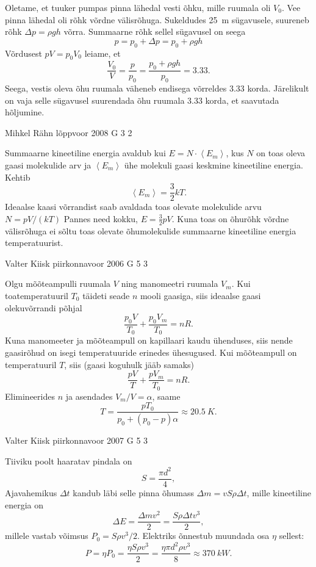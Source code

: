 \documentclass[11pt]{article}
\begin{document}
{{\ifSolution
Oletame, et tuuker pumpas pinna lähedal vesti õhku, mille ruumala oli $V_0$. Vee pinna lähedal oli rõhk võrdne välisrõhuga. Sukeldudes \SI{25}{m} sügavusele, suureneb rõhk $\Delta p = \rho gh$ võrra. Summaarne rõhk sellel sügavusel on seega
\[
p=p_{0}+\Delta p=p_{0}+\rho g h
\]
Võrdusest $pV=p_0V_0$ leiame, et
\[
\frac{V_{0}}{V}=\frac{p}{p_{0}}=\frac{p_{0}+\rho g h}{p_{0}}=\num{3,33}.
\]
Seega, vestis oleva õhu ruumala väheneb endisega võrreldes \num{3,33} korda. Järelikult on vaja selle sügavusel suurendada õhu ruumala \num{3,33} korda, et saavutada hõljumine.
\fi
}

{Mihkel Rähn} %
{lõppvoor} %
{2008} %
{G 3} %
{2} %
{

\ifSolution
Summaarne kineetiline energia avaldub kui $E = N \cdot \left\langle E_m\right\rangle$, kus $N$ on toas oleva gaasi molekulide arv ja $\left\langle E_m\right\rangle$ ühe molekuli gaasi keskmine kineetiline energia. Kehtib
\[
\left\langle E_{m}\right\rangle=\frac{3}{2} k T.
\]
Ideaalse kaasi võrrandist saab avaldada toas olevate molekulide arvu $N = pV /(kT)$ Pannes need kokku, $E = \frac{3}{2} pV$. Kuna toas on õhurõhk võrdne välisrõhuga ei sõltu toas olevate õhumolekulide summaarne kineetiline energia temperatuurist.
\fi
}

{Valter Kiisk} %
{piirkonnavoor} %
{2006} %
{G 5} %
{3} %
{

\ifSolution
Olgu mõõteampulli ruumala $V$ ning manomeetri ruumala $V_m$. Kui toatemperatuuril $T_0$ täideti seade $n$ mooli gaasiga, siis ideaalse gaasi olekuvõrrandi põhjal
\[
\frac{p_0V}{T_0} + \frac{p_0V_m}{T_0} = nR.
\]
Kuna manomeeter ja mõõteampull on kapillaari kaudu ühenduses, siis nende gaasirõhud on isegi temperatuuride erinedes ühesugused. Kui mõõteampull on temperatuuril $T$, siis (gaasi koguhulk jääb samaks)
\[
\frac{pV}{T} + \frac{pV_m}{T_0} = nR.
\]
Elimineerides $n$ ja asendades $V_m/V = \alpha$, saame
\[
T=\frac{p T_{0}}{p_{0}+\left(p_{0}-p\right) \alpha} \approx \SI{20,5}{K}.
\]
\fi
}

{Valter Kiisk} %
{piirkonnavoor} %
{2007} %
{G 5} %
{3} %
{

\ifSolution
Tiiviku poolt haaratav pindala on
\[
S = \frac{\pi d^2}{4},
\]
Ajavahemikus $\Delta t$ kandub läbi selle pinna õhumass $\Delta m = vS\rho \Delta t$, mille kineetiline energia on
\[
\Delta E=\frac{\Delta m v^{2}}{2}=\frac{S \rho \Delta t v^{3}}{2},
\]
millele vastab võimsus $P_0 = S\rho v^3/2$. Elektriks õnnestub muundada
osa $\eta$ sellest:
\[
P=\eta P_{0}=\frac{\eta S \rho v^{3}}{2}=\frac{\eta \pi d^2 \rho v^{3}}{8} \approx \SI{370}{kW}.
\]
\fi
}

}
\end{document}
